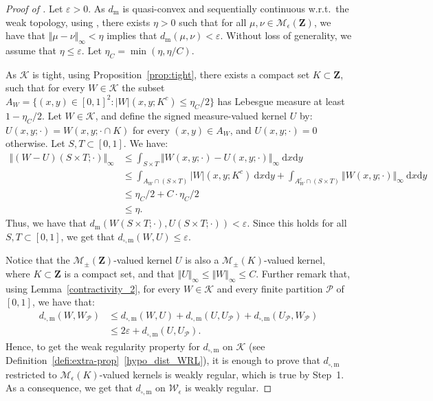 \documentclass{amsart}
\newcommand{\wrt}{w.r.t.\ }
\theoremstyle{plain}
\theoremstyle{definition}
\newcommand{\Space}{\mathbf{Z}}
\newcommand{\ck}{\mathcal{K}}
\newcommand{\cP}{\mathcal{P}}
\newcommand{\SignedMeas}{\mathcal{M}_{\pm}(\Space)}
\newcommand{\MeasEps}{\mathcal{M}_{\epsilon}(\Space)}
\newcommand{\MeasEpsK}{\mathcal{M}_{\epsilon}(K)}
\newcommand{\SignedMeasK}{\mathcal{M}_{\pm}(K)}
\newcommand{\KernelEps}{\mathcal{W}_{\epsilon}}
\newcommand{\TM}[1]{\norm{#1}_\infty}
\newcommand{\m}{\mathrm{m}}
\newcommand{\dmeas}{d_\m}
\newcommand{\dcut}{d_{\square,\m}}
\newcommand{\drv}{\mathrm{d}}
\newcommand{\norm}[1]{\Vert#1\Vert}
\newcommand{\eps}{\varepsilon}
\begin{document}
\begin{proof}[Proof of ]
  Let $\eps > 0$. 
 As $\dmeas$ is quasi-convex and sequentially continuous \wrt the weak topology,
using , there exists $\eta>0$ such that
for all $\mu,\nu\in \MeasEps$, we have that $\TM{\mu - \nu} < \eta$ 
implies that $\dmeas(\mu,\nu) < \eps$.
Without loss of generality, we assume that $\eta \leq \eps$.
Let $\eta_C = \min(\eta, \eta / C)$.

  As  $\ck$ is  tight,
  using  Proposition~\ref{prop:tight},   there  exists  a   compact  set
  $K \subset \Space$, such that  for every $W\in \mathcal{K}$ the subset
  $A_W  = \{  (x,y)\in [0,1]^2  : \vert W\vert(x,y;  K^c) \leq  \eta_C / 2 \}$  has Lebesgue
  measure at  least $1-\eta_C / 2$.  
  Let $W\in  \ck$, and  define the
  signed measure-valued kernel  $U$ by:  $U(x,y;\cdot) = W(x,y;\cdot  \cap K)$
  for  every $(x,y)\in  A_W$,  and $U(x,y;\cdot)  =  0$
  otherwise. 
Let $S,T \subset [0,1]$. We have:
\begin{align*}
\TM{(W-U)(S\times T; \cdot)}
& \leq \int_{S\times T}\TM{W(x,y;\cdot)-U(x,y;\cdot)} \ \drv x\drv y \\
& \leq   \int_{A_W \cap (S\times T)} \vert W\vert(x,y;K^c) \ \drv x\drv y
	+ \int_{A_W^c \cap (S\times T)} \TM{W(x,y;\cdot)} \ \drv x\drv y \\
& \leq \eta_C / 2 + C \cdot \eta_C / 2 \\ 
& \leq \eta. 
\end{align*}
Thus, we have that $\dmeas(W(S\times T; \cdot), U(S\times T; \cdot)) < \eps$.
Since this holds for all $S,T \subset [0,1]$, we get that
	$\dcut(W,U) \leq \eps$.

Notice that the $\SignedMeas$-valued kernel  $U$ is also  a
$\SignedMeasK$-valued kernel, where $K\subset \Space$ is a compact set,
and that $\TM{U} \leq \TM{W} \leq C$.
Further remark that, using Lemma~\ref{contractivity_2},
	for every $W\in\ck$ and every finite partition $\cP$ of $[0,1]$,
	we have that:
\begin{align*}
\dcut(W , W_\cP)
& \leq \dcut(W , U) + \dcut(U , U_\cP) + \dcut(U_\cP , W_\cP) \\
& \leq 2 \eps + \dcut(U , U_\cP) .
\end{align*}
Hence, to get the weak regularity property for $\dcut$ on $\ck$ 
	(see Definition~\ref{defi:extra-prop}~\ref{hypo_dist_WRL}),
	it is enough to prove that $\dcut$ restricted to 
	$\MeasEpsK$-valued kernels is weakly regular,
	which is true by Step~1.
As a consequence, we get that $\dcut$ on $\KernelEps$
	is weakly regular.
\end{proof}
\end{document}
